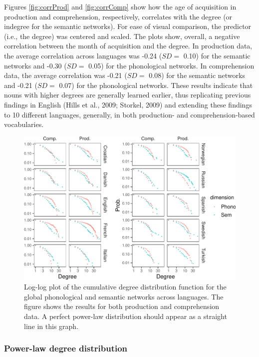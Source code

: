 \documentclass[english,,man,floatsintext]{apa6}
\begin{document}
Figures \ref{fig:corrProd} and \ref{fig:corrComp} show how the age of acquisition in production and comprehension, respectively, correlates with the degree (or indegree for the semantic networks). For ease of visual comparison, the predictor (i.e., the degree) was centered and scaled. The plots show, overall, a negative correlation between the month of acquisition and the degree. In production data, the average correlation across languages was -0.24 (\(SD=\) 0.10) for the semantic networks and -0.30 (\(SD=\) 0.05) for the phonological networks. In comprehension data, the average correlation was -0.21 (\(SD=\) 0.08) for the semantic networks and -0.21 (\(SD=\) 0.07) for the phonological networks. These results indicate that nouns with higher degrees are generally learned earlier, thus replicating previous findings in English (Hills et al., 2009; Storkel, 2009) and extending these findings to 10 different languages, generally, in both production- and comprehension-based vocabularies.

\begin{figure}[!h]
\includegraphics[width=\textwidth]{ms_files/figure-latex/degreeDist-1} \caption{Log-log plot of the cumulative degree distribution function for the global phonological and semantic networks across languages. The figure shows the results for both production and comprehension data. A perfect power-law distribution should appear as a straight line in this graph.}\label{fig:degreeDist}
\end{figure}

\hypertarget{power-law-degree-distribution}{%
\subsubsection{Power-law degree distribution}\label{power-law-degree-distribution}}
\end{document}
